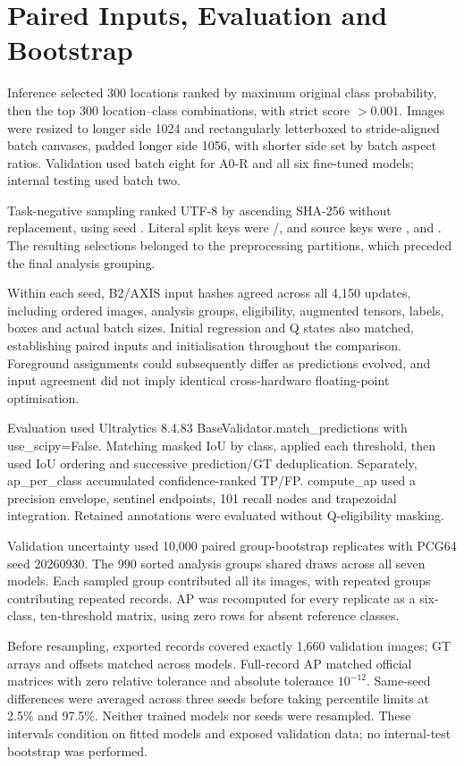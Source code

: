 \section{Paired Inputs, Evaluation and Bootstrap}
\label{app:matched-inputs}

Inference selected 300 locations ranked by maximum original class probability, then the top 300 location--class combinations, with strict score $>0.001$. Images were resized to longer side 1024 and rectangularly letterboxed to stride-aligned batch canvases, padded longer side 1056, with shorter side set by batch aspect ratios. Validation used batch eight for A0-R and all six fine-tuned models; internal testing used batch two.



Task-negative sampling ranked UTF-8  by ascending SHA-256 without replacement, using seed . Literal split keys were /, and source keys were ,  and . The resulting selections belonged to the preprocessing partitions, which preceded the final analysis grouping.

Within each seed, B2/AXIS input hashes agreed across all 4,150 updates, including ordered images, analysis groups, eligibility, augmented tensors, labels, boxes and actual batch sizes. Initial regression and Q states also matched, establishing paired inputs and initialisation throughout the comparison. Foreground assignments could subsequently differ as predictions evolved, and input agreement did not imply identical cross-hardware floating-point optimisation.

Evaluation used Ultralytics 8.4.83 BaseValidator.match\_predictions with use\_scipy=False. Matching masked IoU by class, applied each threshold, then used IoU ordering and successive prediction/GT deduplication. Separately, ap\_per\_class accumulated confidence-ranked TP/FP. compute\_ap used a precision envelope, sentinel endpoints, 101 recall nodes and trapezoidal integration. Retained annotations were evaluated without Q-eligibility masking.

Validation uncertainty used 10,000 paired group-bootstrap replicates with PCG64 seed 20260930. The 990 sorted analysis groups shared draws across all seven models. Each sampled group contributed all its images, with repeated groups contributing repeated records. AP was recomputed for every replicate as a six-class, ten-threshold matrix, using zero rows for absent reference classes.

Before resampling, exported records covered exactly 1,660 validation images; GT arrays and offsets matched across models. Full-record AP matched official matrices with zero relative tolerance and absolute tolerance \(10^{-12}\). Same-seed differences were averaged across three seeds before taking percentile limits at 2.5\% and 97.5\%. Neither trained models nor seeds were resampled. These intervals condition on fitted models and exposed validation data; no internal-test bootstrap was performed.

\FloatBarrier
